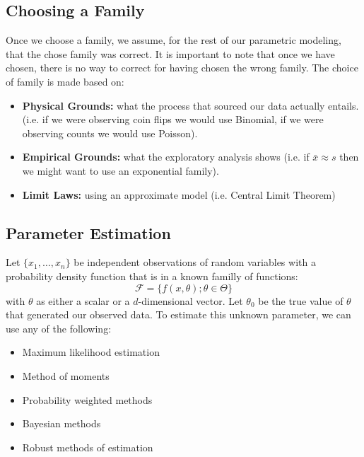 \documentclass{article}
\theoremstyle{definition}
\theoremstyle{definition}
\def\xs{\{x_1, \hdots, x_n\}}
\begin{document}
\subsection{Choosing a Family}
Once we choose a family, we assume, for the rest of our parametric modeling, that the chose family was correct. It is important to note that once we have chosen, there is no way to correct for having chosen the wrong family. The choice of family is made based on:
\begin{itemize}
    \item \textbf{Physical Grounds:} what the process that sourced our data actually entails. (i.e. if we were observing coin flips we would use Binomial, if we were observing counts we would use Poisson).
    \item \textbf{Empirical Grounds:} what the exploratory analysis shows (i.e. if $\bar{x}\approx s$ then we might want to use an exponential family).
    \item \textbf{Limit Laws:} using an approximate model (i.e. Central Limit Theorem)
\end{itemize}

\subsection{Parameter Estimation}
Let $\xs$ be independent observations of random variables with a probability density function that is in a known familly of functions:
\[\mathcal{F} = \{f(x,\theta); \theta\in\Theta \} \]
with $\theta$ as either a scalar or a $d$-dimensional vector. Let $\theta_0$ be the true value of $\theta$ that generated our observed data. To estimate this unknown parameter, we can use any of the following:
\begin{itemize}
    \item Maximum likelihood estimation
    \item Method of moments
    \item Probability weighted methods
    \item Bayesian methods
    \item Robust methods of estimation
\end{itemize}
\end{document}
